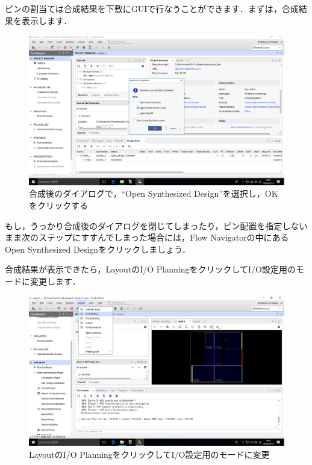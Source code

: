 \documentclass[a4paper,dvipdfmx]{jsarticle}
\begin{document}
ピンの割当ては合成結果を下敷にGUIで行なうことができます．まずは，合成結果を表示します．

 \begin{figure}[H]
  \begin{center}
   \includegraphics[width=.8\textwidth]{chapter03_figures/VirtualBox_Windows10_19_03_2018_00_08_14.png}
  \end{center}
  \caption{合成後のダイアログで，``Open Synthesized Design''を選択し，OKをクリックする}
 \end{figure}

もし，うっかり合成後のダイアログを閉じてしまったり，ピン配置を指定しないまま次のステップにすすんでしまった場合には，Flow Navigatorの中にあるOpen Synthesized Designをクリックしましょう．

合成結果が表示できたら，LayoutのI/O PlanningをクリックしてI/O設定用のモードに変更します．
 \begin{figure}[H]
  \begin{center}
   \includegraphics[width=.8\textwidth]{chapter03_figures/VirtualBox_Windows10_19_03_2018_00_09_32.png}
  \end{center}
  \caption{LayoutのI/O PlanningをクリックしてI/O設定用のモードに変更}
 \end{figure}
\end{document}

